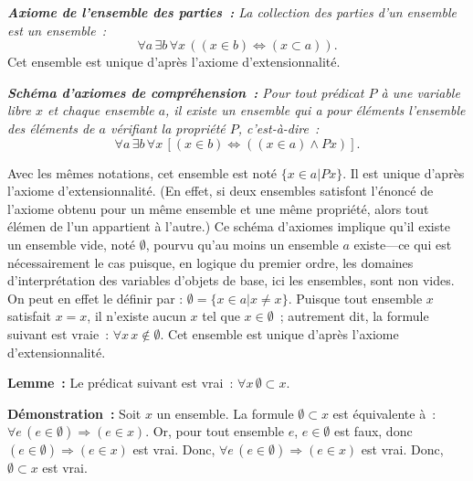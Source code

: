 \medskip

\noindent\textit{\textbf{Axiome de l'ensemble des parties :} La collection des parties d'un ensemble est un ensemble :} 
\begin{equation*}
    \forall a \, \exists b \, \forall x \, (
        (x \in b) \Leftrightarrow (x \subset a)
    ).
\end{equation*}
Cet ensemble est unique d'après l'axiome d'extensionnalité.

\medskip

\noindent\textit{\textbf{Schéma d'axiomes de compréhension :} 
Pour tout prédicat $P$ à une variable libre $x$ et chaque ensemble $a$, il existe un ensemble qui a pour éléments l'ensemble des éléments de $a$ vérifiant la propriété $P$, c'est-à-dire :}
\begin{equation*}
\forall a \, \exists b \, \forall x \, [ (x \in b) \Leftrightarrow ((x \in a) \wedge P x)]. 
\end{equation*}

Avec les mêmes notations, cet ensemble est noté $\lbrace x \in a \vert P x \rbrace$. 
Il est unique d'après l'axiome d'extensionnalité. 
(En effet, si deux ensembles satisfont l'énoncé de l'axiome obtenu pour un même ensemble et une même propriété, alors tout élémen de l'un appartient à l'autre.)
Ce schéma d'axiomes implique qu'il existe un ensemble vide, noté $\emptyset$, pourvu qu'au moins un ensemble $a$ existe—ce qui est nécessairement le cas puisque, en logique du premier ordre, les domaines d'interprétation des variables d'objets de base, ici les ensembles, sont non vides. 
On peut en effet le définir par : $\emptyset = \lbrace x \in a \vert x \neq x \rbrace$. 
Puisque tout ensemble $x$ satisfait $x = x$, il n'existe aucun $x$ tel que $x \in \emptyset$ ; autrement dit, la formule suivant est vraie : $\forall x \, x \notin \emptyset$. 
Cet ensemble est unique d'après l'axiome d'extensionnalité.

\medskip

\noindent\textbf{Lemme :} Le prédicat suivant est vrai : $\forall x \, \emptyset \subset x$.

\medskip

\noindent\textbf{Démonstration :} Soit $x$ un ensemble. 
    La formule $\emptyset \subset x$ est équivalente à : $\forall e \, (e \in \emptyset) \Rightarrow (e \in x)$. 
    Or, pour tout ensemble $e$, $e \in \emptyset$ est faux, donc $(e \in \emptyset) \Rightarrow (e \in x)$ est vrai.
    Donc, $\forall e \, (e \in \emptyset) \Rightarrow (e \in x)$ est vrai. 
    Donc, $\emptyset \subset x$ est vrai.

